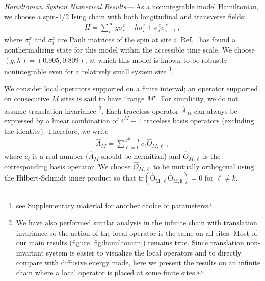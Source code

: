 \documentclass[twocolumn,superscriptaddress, prb]{revtex4-1}
\begin{document}
{\it Hamiltonian System Numerical Results---}
As a nonintegrable model Hamiltonian, we choose a spin-1/2 Ising chain with both longitudinal and transverse fields:
\begin{align}
H = \sum_{i}^{\infty} g\sigma^x_i + h\sigma^z_i + \sigma^z_i \sigma^z_{i+1} ~,
\label{eq:Hamiltonian}
\end{align}
where $\sigma^x_i$ and $\sigma^z_i$ are Pauli matrices of the spin at site $i$.
Ref.~ has found a nonthermalizing state for this model within the accessible time scale.
We choose $(g,h) = (0.905, 0.809)$, at which this model is known to be robustly nonintegrable even for a relatively small system size \cite{Kim:2013}
\footnote{see Supplementary material for another choice of parameters}.

We consider local operators supported on a finite interval; an operator supported on consecutive $M$ sites is said to have ``range $M$".
For simplicity, we do not assume translation invariance
\footnote{We have also performed similar analysis in the infinite chain with translation invariance so the action of the local operator is the same on all sites. Most of our main results (figure \ref{fig:hamiltonian})
remains true. Since translation non-invariant system is easier to visualize the local operators and to directly compare with diffusive energy mode, here we present the results on an infinite chain where a local operator is placed at some finite sites.}.
Each traceless operator
$\hat{A}_M$ can always be expressed by a linear combination of $4^M - 1$ traceless basis operators (excluding the identity).
Therefore, we write
\begin{align}
\hat{A}_M = \sum_{\ell = 1}^{4^M - 1} c_\ell \hat{O}_{M,\ell} ~,
\end{align}
where $c_\ell$ is a real number ($\hat{A}_M$ should be hermitian) and $\hat{O}_{M,\ell}$ is the corresponding basis operator.
We choose $\hat{O}_{M,\ell}$ to be mutually orthogonal using the Hilbert-Schmidt inner product so that
$\mathrm{tr(\hat{O}_{M,\ell} \hat{O}_{M,k})} = 0$ for $\ell\neq k$.
\end{document}
